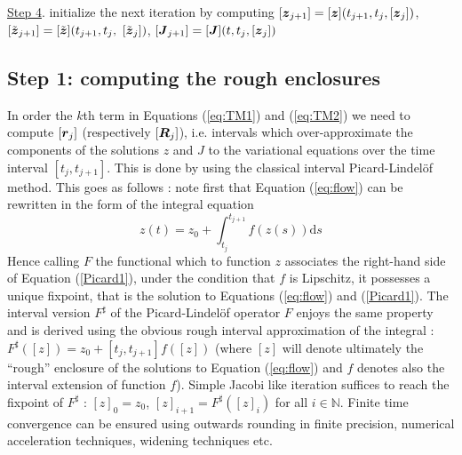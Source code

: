 \documentclass{sig-alternate-05-2015} %
\newcommand\ForAuthors[1]%
 {\par\smallskip                     %
  \begin{center}%
   \fbox%
   {\parbox{0.9\linewidth}%
    {\raggedright\sc--- #1}%
   }%
  \end{center}%
  \par\smallskip                     %
 }
\def\N{{\mathbb N}}
\def\intvl#1{\mbox{$[ #1 ]$}}
\begin{document}
{\begin{center}
{{\underline{Step 4}. initialize the next iteration by computing $[{\z}_{j+1}]=[\z](t_{j+1},t_j,[{\z}_j])$, $[\tilde{\z}_{j+1}]=[\tilde{\z}](t_{j+1},t_j,$ $[\tilde{\z}_j])$, $[\J_{j+1}] = [\J](t,t_j,[{\z}_j]) $\\
 }%
   }%
  \end{center}%
  \par\smallskip                     %
 }        


\subsection{Step 1: computing the rough enclosures}
\label{roughenc}

In order the $k$th term in Equations (\ref{eq:TM1}) and (\ref{eq:TM2}) we need
to compute $\intvl{\r_j}$ (respectively $\intvl{\bfm{R}_j}$), i.e. intervals which over-approximate 
the components of the solutions $z$ and $J$ to the variational equations over the
time interval $[t_j,t_{j+1}]$. This is done by using the classical interval
Picard-Lindel\"of method. This goes as follows : note first that Equation 
(\ref{eq:flow}) can be rewritten in the form of the integral equation
\begin{equation}
z(t) = z_0+\int_{t_j}^{t_{j+1}} \! f(z(s)) \mathrm{d}s
\label{Picard1}
\end{equation}
Hence calling $F$ the functional which to function $z$ associates the right-hand
side of Equation (\ref{Picard1}), under the condition that $f$ is Lipschitz, it 
possesses a unique fixpoint, that is the solution to Equations (\ref{eq:flow}) and
(\ref{Picard1}). The interval version ${F}^{\sharp}$ of the Picard-Lindel\"of operator $F$ 
enjoys the same property and is derived using the obvious rough interval approximation
of the integral : $F^{\sharp}(\intvl{z})=z_0+[t_j,t_{j+1}]f(\intvl{z})$ (where
$\intvl{z}$ will denote ultimately the ``rough'' enclosure of the solutions to
Equation (\ref{eq:flow}) and $f$ denotes also the interval extension of function $f$). 
Simple Jacobi like iteration suffices to reach the fixpoint of $F^{\sharp}$ : 
$\intvl{z}_0=z_0$, $\intvl{z}_{i+1}=F^{\sharp}(\intvl{z}_i)$ for all $i \in \N$. 
Finite time convergence can be ensured using outwards rounding in finite precision,
numerical acceleration techniques, widening techniques etc. 

\end{document}

